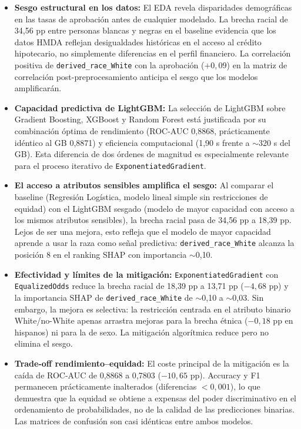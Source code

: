 \documentclass[11pt,a4paper]{article}
\begin{document}
\begin{itemize}

    \item \textbf{Sesgo estructural en los datos:} El EDA revela disparidades demográficas en
    las tasas de aprobación antes de cualquier modelado. La brecha racial de 34{,}56 pp entre
    personas blancas y negras en el baseline evidencia que los datos HMDA reflejan desigualdades
    históricas en el acceso al crédito hipotecario, no simplemente diferencias en el perfil financiero.
    La correlación positiva de \texttt{derived\_race\_White} con la aprobación ($+0{,}09$) en
    la matriz de correlación post-preprocesamiento anticipa el sesgo que los modelos amplificarán.

    \item \textbf{Capacidad predictiva de LightGBM:} La selección de LightGBM sobre Gradient
    Boosting, XGBoost y Random Forest está justificada por su combinación óptima de rendimiento
    (ROC-AUC 0{,}8868, prácticamente idéntico al GB 0{,}8871) y eficiencia computacional
    (1{,}90 s frente a $\sim$320 s del GB). Esta diferencia de dos órdenes de magnitud es
    especialmente relevante para el proceso iterativo de \texttt{ExponentiatedGradient}.

    \item \textbf{El acceso a atributos sensibles amplifica el sesgo:} Al comparar el baseline
    (Regresión Logística, modelo lineal simple sin restricciones de equidad) con el LightGBM sesgado
    (modelo de mayor capacidad con acceso a los mismos atributos sensibles), la brecha
    racial pasa de 34{,}56 pp a 18{,}39 pp. Lejos de ser una mejora, esto refleja que el modelo
    de mayor capacidad aprende a usar la raza como señal predictiva: \texttt{derived\_race\_White}
    alcanza la posición 8 en el ranking SHAP con importancia $\sim$0{,}10.

    \item \textbf{Efectividad y límites de la mitigación:} \texttt{ExponentiatedGradient} con
    \texttt{EqualizedOdds} reduce la brecha racial de 18{,}39 pp a 13{,}71 pp ($-4{,}68$ pp)
    y la importancia SHAP de \texttt{derived\_race\_White} de $\sim$0{,}10 a $\sim$0{,}03.
    Sin embargo, la mejora es selectiva: la restricción centrada en el atributo binario
    White/no-White apenas arrastra mejoras para la brecha étnica ($-0{,}18$ pp en hispanos)
    ni para la de sexo. La mitigación algorítmica reduce pero no elimina el sesgo.

    \item \textbf{Trade-off rendimiento--equidad:} El coste principal de la mitigación es la
    caída de ROC-AUC de 0{,}8868 a 0{,}7803 ($-10{,}65$ pp). Accuracy y F1 permanecen
    prácticamente inalterados (diferencias $<0{,}001$), lo que demuestra que la equidad se
    obtiene a expensas del poder discriminativo en el ordenamiento de probabilidades, no de
    la calidad de las predicciones binarias. Las matrices de confusión son casi idénticas entre
    ambos modelos.


\end{itemize}
\end{document}
